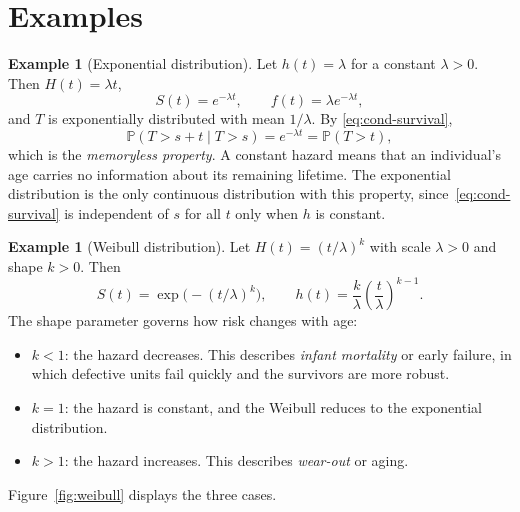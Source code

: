 \documentclass[11pt]{article}
\theoremstyle{definition}
\newtheorem{example}[definition]{Example}
\theoremstyle{plain}
\newcommand{\Prob}{\mathbb{P}}
\begin{document}
\section{Examples}\label{sec:examples}

\begin{example}[Exponential distribution]\label{ex:exponential}
Let $h(t) = \lambda$ for a constant $\lambda > 0$. Then $H(t) = \lambda t$,
\[
  S(t) = e^{-\lambda t}, \qquad f(t) = \lambda e^{-\lambda t},
\]
and $T$ is exponentially distributed with mean $1/\lambda$. By \eqref{eq:cond-survival},
\[
  \Prob(T > s + t \mid T > s) = e^{-\lambda t} = \Prob(T > t),
\]
which is the \emph{memoryless property}. A constant hazard means that an individual's age carries no information about its remaining lifetime. The exponential distribution is the only continuous distribution with this property, since~\eqref{eq:cond-survival} is independent of $s$ for all $t$ only when $h$ is constant.
\end{example}

\begin{example}[Weibull distribution]\label{ex:weibull}
Let $H(t) = (t/\lambda)^k$ with scale $\lambda > 0$ and shape $k > 0$. Then
\[
  S(t) = \exp\!\bigl(-(t/\lambda)^k\bigr), \qquad
  h(t) = \frac{k}{\lambda}\left(\frac{t}{\lambda}\right)^{k-1}.
\]
The shape parameter governs how risk changes with age:
\begin{itemize}
  \item $k < 1$: the hazard decreases. This describes \emph{infant mortality} or early failure, in which defective units fail quickly and the survivors are more robust.
  \item $k = 1$: the hazard is constant, and the Weibull reduces to the exponential distribution.
  \item $k > 1$: the hazard increases. This describes \emph{wear-out} or aging.
\end{itemize}
Figure~\ref{fig:weibull} displays the three cases.
\end{example}
\end{document}
